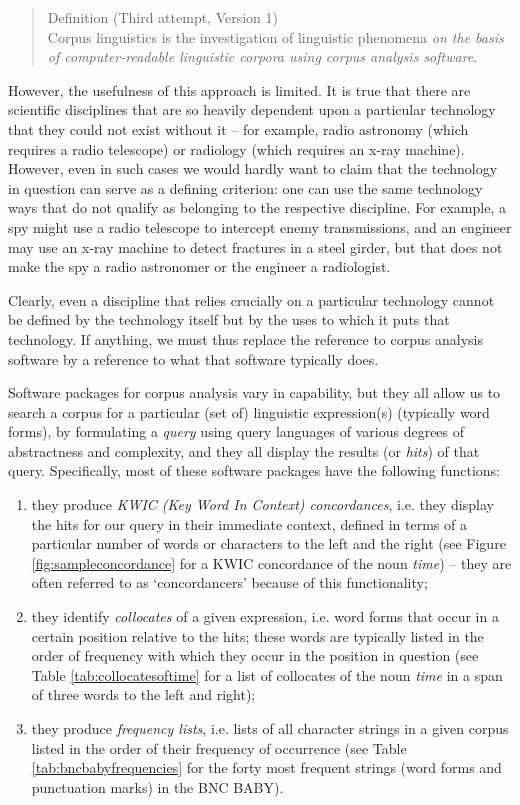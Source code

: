 \begin{quotation}
Definition (Third attempt, Version 1) \\
Corpus linguistics is the investigation of linguistic phenomena \emph{on the basis of computer-readable linguistic corpora using corpus analysis software}.
\end{quotation}

However, the usefulness of this approach is limited. It is true that there are scientific disciplines that are so heavily dependent upon a particular technology that they could not exist without it -- for example, radio astronomy (which requires a radio telescope) or radiology (which requires an x-ray machine). However, even in such cases we would hardly want to claim that the technology in question can serve as a defining criterion: one can use the same technology ways that do not qualify as belonging to the respective discipline. For example, a spy might use a radio telescope to intercept enemy transmissions, and an engineer may use an x-ray machine to detect fractures in a steel girder, but that does not make the spy a radio astronomer or the engineer a radiologist.

Clearly, even a discipline that relies crucially on a particular technology cannot be defined by the technology itself but by the uses to which it puts that technology. If anything, we must thus replace the reference to corpus analysis software by a reference to what that software typically does.

Software packages for corpus analysis vary in capability, but they all allow us to search a corpus for a particular (set of) linguistic expression(s) (typically word forms), by formulating a \emph{query} using query languages of various degrees of abstractness and complexity, and they all display the results (or \emph{hits}) of that query. Specifically, most of these software packages have the following functions:

\begin{enumerate}
\item they produce \emph{KWIC (Key Word In Context) concordances}, i.e. they display the hits for our query in their immediate context, defined in terms of a particular number of words or characters to the left and the right (see Figure \ref{fig:sampleconcordance} for a KWIC concordance of the noun \emph{time}) -- they are often referred to as `concordancers' because of this functionality;
\item they identify \emph{collocates} of a given expression, i.e. word forms that occur in a certain position relative to the hits; these words are typically listed in the order of frequency with which they occur in the position in question (see Table \ref{tab:collocatesoftime} for a list of collocates of the noun \textit{time} in a span of three words to the left and right);
\item they produce \emph{frequency lists}, i.e. lists of all character strings in a given corpus listed in the order of their frequency of occurrence (see Table \ref{tab:bncbabyfrequencies} for the forty most frequent strings (word forms and punctuation marks) in the BNC BABY).
\end{enumerate}


